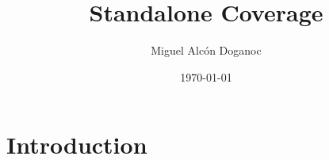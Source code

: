 \documentclass[sigconf,authorversion]{acmart}
\title{Standalone Coverage}
\author{Miguel Alcón Doganoc}
\affiliation{%
  \institution{Universitat Politècnica de Catalunya}
  \city{Barcelona}
  \country{Spain}}
\date{\today}
\begin{document}
\begin{abstract}  
  
\end{abstract} 

\maketitle

\section{Introduction}
\end{document}
